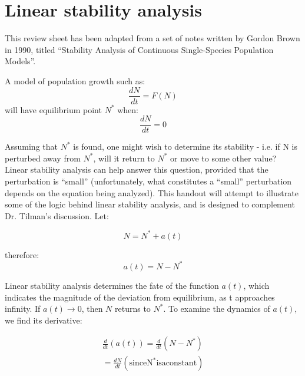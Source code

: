 \documentclass[12pt]{article}
\begin{document}
\maketitle

\section{Linear stability analysis}
This review sheet has been adapted from a set of notes written by Gordon Brown in 1990, titled ``Stability Analysis of Continuous Single-Species Population Models''.

A model of population growth such as:
\begin{equation}
\frac{dN}{dt} = F(N)
\end{equation}
will have equilibrium point $N^{*}$ when:
\begin{equation}
\frac{dN}{dt} = 0
\end{equation}

Assuming that $N^{*}$ is found, one might wish to determine its stability - i.e. if N is perturbed away from $N^{*}$, will it return to $N^{*}$ or move to some other value? Linear stability analysis can help answer this question, provided that the perturbation is ``small'' (unfortunately, what constitutes a ``small'' perturbation depends on the equation being analyzed). This handout will attempt to illustrate some of the logic behind linear stability analysis, and is designed to complement Dr. Tilman's discussion. Let:

\begin{equation}
N = N^{*} + a(t)
\end{equation}

therefore:
\begin{equation}
a(t) = N - N^{*}
\end{equation}

Linear stability analysis determines the fate of the function $a(t)$, which indicates the magnitude of the deviation from equilibrium, as t approaches infinity. If $a(t) \rightarrow 0$, then $N$ returns to $N^{*}$. To examine the dynamics of $a(t)$, we find its derivative:

\begin{equation}
\begin{split}
\frac{d}{dt}(a(t)) = \frac{d}{dt}(N-N^{*})\\
= \frac{dN}{dt} \mathrm{(since N^{*} is a constant)}
\end{split}
\end{equation}
\end{document}
